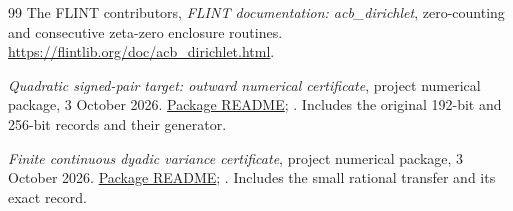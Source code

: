 \documentclass[11pt]{article}
\theoremstyle{remark}
\numberwithin{equation}{section}
\begin{document}
\begin{thebibliography}{99}
The FLINT contributors, \emph{FLINT documentation: acb\_dirichlet},
zero-counting and consecutive zeta-zero enclosure routines.
\url{https://flintlib.org/doc/acb_dirichlet.html}.

\emph{Quadratic signed-pair target: outward numerical certificate},
project numerical package, 3 October 2026.
\href{../../investigations/sonin-critical-boundary/numerics/selective_loss_quadratic_target_20261003/README.md}{Package README};
.
Includes the original 192-bit and 256-bit records and their generator.

\emph{Finite continuous dyadic variance certificate},
project numerical package, 3 October 2026.
\href{../../investigations/sonin-critical-boundary/numerics/subpower_finite_variance_20261003/README.md}{Package README};
.
Includes the small rational transfer and its exact record.
\end{thebibliography}
\end{document}
